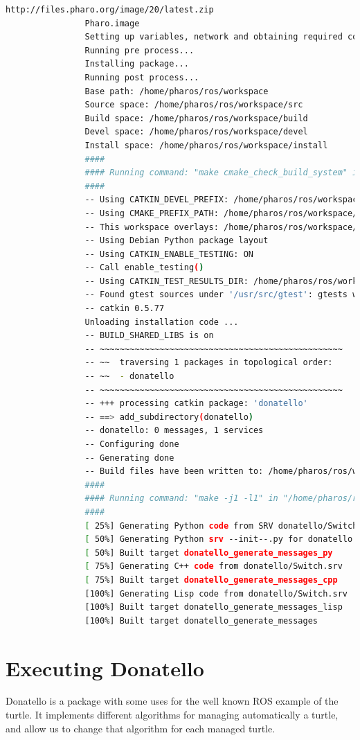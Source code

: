 \documentclass[a4paper,10pt,twoside]{book}
\begin{document}
\begin{lstlisting}[language=bash,title={Installing donatello - Output}]
				    http://files.pharo.org/image/20/latest.zip
				Pharo.image
				Setting up variables, network and obtaining required code....
				Running pre process...  
				Installing package... 
				Running post process... 
				Base path: /home/pharos/ros/workspace
				Source space: /home/pharos/ros/workspace/src
				Build space: /home/pharos/ros/workspace/build
				Devel space: /home/pharos/ros/workspace/devel
				Install space: /home/pharos/ros/workspace/install
				####
				#### Running command: "make cmake_check_build_system" in "/home/pharos/ros/workspace/build"
				####
				-- Using CATKIN_DEVEL_PREFIX: /home/pharos/ros/workspace/devel
				-- Using CMAKE_PREFIX_PATH: /home/pharos/ros/workspace/devel;/opt/ros/groovy
				-- This workspace overlays: /home/pharos/ros/workspace/devel;/opt/ros/groovy
				-- Using Debian Python package layout
				-- Using CATKIN_ENABLE_TESTING: ON
				-- Call enable_testing()
				-- Using CATKIN_TEST_RESULTS_DIR: /home/pharos/ros/workspace/build/test_results
				-- Found gtest sources under '/usr/src/gtest': gtests will be built
				-- catkin 0.5.77
				Unloading installation code ... 
				-- BUILD_SHARED_LIBS is on
				-- ~~~~~~~~~~~~~~~~~~~~~~~~~~~~~~~~~~~~~~~~~~~~~~~~~
				-- ~~  traversing 1 packages in topological order:
				-- ~~  - donatello
				-- ~~~~~~~~~~~~~~~~~~~~~~~~~~~~~~~~~~~~~~~~~~~~~~~~~
				-- +++ processing catkin package: 'donatello'
				-- ==> add_subdirectory(donatello)
				-- donatello: 0 messages, 1 services
				-- Configuring done
				-- Generating done
				-- Build files have been written to: /home/pharos/ros/workspace/build
				####
				#### Running command: "make -j1 -l1" in "/home/pharos/ros/workspace/build"
				####
				[ 25%] Generating Python code from SRV donatello/Switch
				[ 50%] Generating Python srv --init--.py for donatello
				[ 50%] Built target donatello_generate_messages_py
				[ 75%] Generating C++ code from donatello/Switch.srv
				[ 75%] Built target donatello_generate_messages_cpp
				[100%] Generating Lisp code from donatello/Switch.srv
				[100%] Built target donatello_generate_messages_lisp
				[100%] Built target donatello_generate_messages

			\end{lstlisting}
		
			
		\section{Executing Donatello} 


			Donatello is a package with some uses for the well known ROS example of the turtle. 
			It implements different algorithms for managing automatically a turtle, and allow us to change that algorithm for each managed turtle. 
			
\end{document}
